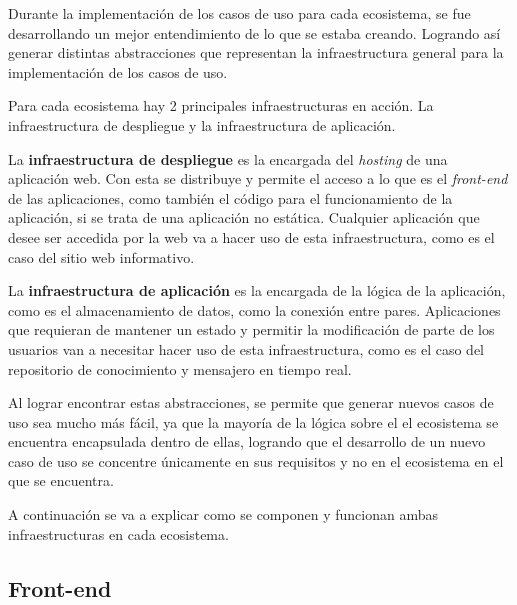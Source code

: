 Durante la implementación de los casos de uso para cada ecosistema, se fue desarrollando un mejor entendimiento de lo que se estaba creando. Logrando así generar distintas abstracciones que representan la infraestructura general para la implementación de los casos de uso.

Para cada ecosistema hay 2 principales infraestructuras en acción. La infraestructura de despliegue y la infraestructura de aplicación.

La \textbf{infraestructura de despliegue} es la encargada del \textit{hosting} de una aplicación web. Con esta se distribuye y permite el acceso a lo que es el \textit{front-end} de las aplicaciones, como también el código para el funcionamiento de la aplicación, si se trata de una aplicación no estática. Cualquier aplicación que desee ser accedida por la web va a hacer uso de esta infraestructura, como es el caso del sitio web informativo.

La \textbf{infraestructura de aplicación} es la encargada de la lógica de la aplicación, como es el almacenamiento de datos, como la conexión entre pares. Aplicaciones que requieran de mantener un estado y permitir la modificación de parte de los usuarios van a necesitar hacer uso de esta infraestructura, como es el caso del repositorio de conocimiento y mensajero en tiempo real.

Al lograr encontrar estas abstracciones, se permite que generar nuevos casos de uso sea mucho más fácil, ya que la mayoría de la lógica sobre el el ecosistema se encuentra encapsulada dentro de ellas, logrando que el desarrollo de un nuevo caso de uso se concentre únicamente en sus requisitos y no en el ecosistema en el que se encuentra.

A continuación se va a explicar como se componen y funcionan ambas infraestructuras en cada ecosistema.







\subsection{Front-end}


